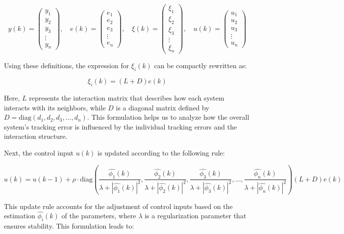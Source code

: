 \documentclass[journal,onecolumn]{IEEEtran}
\begin{document}
\[
y(k) = \begin{pmatrix} y_1 \\ y_2 \\ y_3 \\ \vdots \\ y_n \end{pmatrix}, \quad 
e(k) = \begin{pmatrix} e_1 \\ e_2 \\ e_3 \\ \vdots \\ e_n \end{pmatrix}, \quad 
\xi(k) = \begin{pmatrix} \xi_1 \\ \xi_2 \\ \xi_3 \\ \vdots \\ \xi_n \end{pmatrix}, \quad 
u(k) = \begin{pmatrix} u_1 \\ u_2 \\ u_3 \\ \vdots \\ u_n \end{pmatrix}
\]

Using these definitions, the expression for \(\xi_i(k)\) can be compactly rewritten as:

\begin{equation}
    \label{model 33}
    \xi_i(k) = (L + D) e(k)
\end{equation}

Here, \(L\) represents the interaction matrix that describes how each system interacts with its neighbors, while \(D\) is a diagonal matrix defined by \(D = \text{diag}(d_1, d_2, d_3, \dots, d_n)\). This formulation helps us to analyze how the overall system's tracking error is influenced by the individual tracking errors and the interaction structure.

Next, the control input \(u(k)\) is updated according to the following rule:

\[
u(k) = u(k-1) + \rho \cdot \text{diag}\left(\frac{\hat{\phi_1}(k)}{\lambda + |\hat{\phi_1}(k)|^2}, \frac{\hat{\phi_2}(k)}{\lambda + |\hat{\phi_2}(k)|^2}, \frac{\hat{\phi_3}(k)}{\lambda + |\hat{\phi_3}(k)|^2}, \dots, \frac{\hat{\phi_n}(k)}{\lambda + |\hat{\phi_n}(k)|^2}\right) (L + D) e(k)
\]

This update rule accounts for the adjustment of control inputs based on the estimation \(\hat{\phi_i}(k)\) of the parameters, where \(\lambda\) is a regularization parameter that ensures stability. This formulation leads to:
\end{document}
